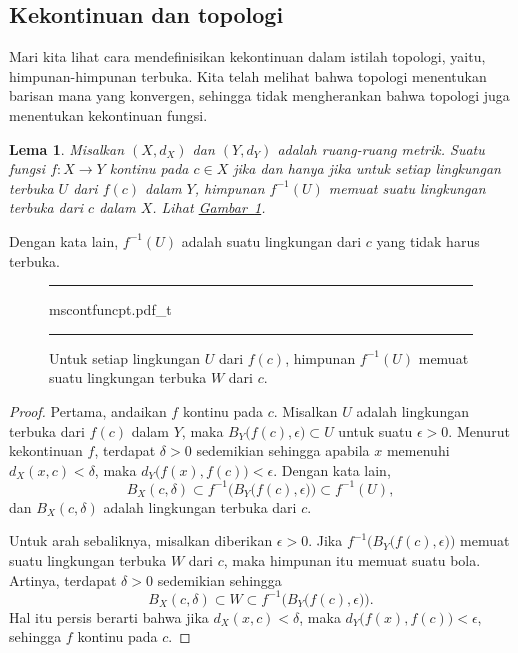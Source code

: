 \documentclass[12pt,openany]{book}
\theoremstyle{plain}
\newtheorem{lemma}[thm]{Lema}
\theoremstyle{remark}
\theoremstyle{definition}
\newenvironment{myfig}{%
\begin{figure}[h!t]
\noindent\rule{\textwidth}{0.5pt}\vspace{12pt}\par\centering}%
{\par\noindent\rule{\textwidth}{0.5pt}
\end{figure}}
\theoremstyle{exercise}
\theoremstyle{example}
\newcommand{\figureref}[1]{\hyperref[#1]{Gambar~\ref*{#1}}}
\begin{document}
\subsection{Kekontinuan dan topologi}

Mari kita lihat cara mendefinisikan kekontinuan dalam istilah topologi, yaitu,
himpunan-himpunan terbuka.  Kita telah melihat bahwa topologi menentukan barisan mana 
yang konvergen, sehingga tidak mengherankan bahwa topologi juga
menentukan kekontinuan fungsi.

\begin{lemma} \label{lemma:mstopocontloc}
Misalkan $(X,d_X)$ dan $(Y,d_Y)$ adalah ruang-ruang metrik.
Suatu fungsi $f \colon X \to Y$ kontinu pada $c \in X$
jika dan hanya jika untuk setiap lingkungan terbuka $U$ dari $f(c)$ dalam $Y$, himpunan
$f^{-1}(U)$ memuat suatu lingkungan terbuka dari $c$ dalam $X$.
Lihat \figureref{fig:mscontfuncpt}.
\end{lemma}

Dengan kata lain, $f^{-1}(U)$ adalah suatu lingkungan dari $c$ yang tidak harus terbuka.

\begin{myfig}
{mscontfuncpt.pdf_t}
\caption{Untuk setiap lingkungan $U$ dari $f(c)$, himpunan $f^{-1}(U)$ memuat suatu
lingkungan terbuka $W$ dari $c$.\label{fig:mscontfuncpt}}
\end{myfig}

\begin{proof}
Pertama, andaikan $f$ kontinu pada $c$.
Misalkan $U$ adalah lingkungan terbuka dari $f(c)$
dalam $Y$, maka $B_Y\bigl(f(c),\epsilon\bigr) \subset U$ untuk suatu $\epsilon >
0$.  Menurut kekontinuan $f$, terdapat $\delta > 0$
sedemikian sehingga apabila $x$ memenuhi $d_X(x,c) < \delta$, maka
$d_Y\bigl(f(x),f(c)\bigr) < \epsilon$.  Dengan kata lain,
\begin{equation*}
B_X(c,\delta) \subset f^{-1}\bigl(B_Y\bigl(f(c),\epsilon\bigr)\bigr) \subset
f^{-1}(U) ,
\end{equation*}
dan $B_X(c,\delta)$ adalah lingkungan terbuka dari $c$.

Untuk arah sebaliknya,
misalkan diberikan $\epsilon > 0$.  Jika
$f^{-1}\bigl(B_Y\bigl(f(c),\epsilon\bigr)\bigr)$ memuat suatu lingkungan
terbuka $W$ dari $c$, maka himpunan itu memuat suatu bola.  Artinya, terdapat $\delta > 0$
sedemikian sehingga
\begin{equation*}
B_X(c,\delta) \subset W \subset f^{-1}\bigl(B_Y\bigl(f(c),\epsilon\bigr)\bigr) .
\end{equation*}
Hal itu persis berarti bahwa jika $d_X(x,c) < \delta$, maka $d_Y\bigl(f(x),f(c)\bigr)
< \epsilon$, sehingga $f$ kontinu pada $c$.
\end{proof}
\end{document}
